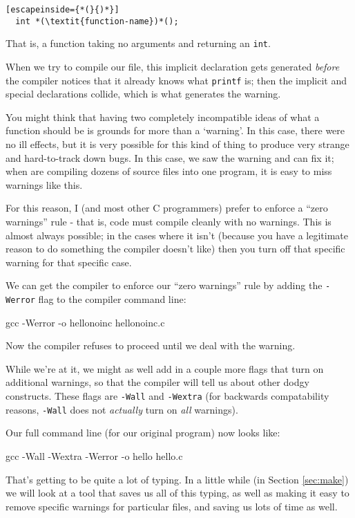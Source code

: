 \documentclass[a4paper,10pt]{article}
\newcommand{\kw}[1]{\texttt{#1}}
\begin{document}
\begin{lstlisting}[escapeinside={*(}{)*}]
  int *(\textit{function-name})*();
\end{lstlisting}

\noindent
That is, a function taking no arguments and returning an \kw{int}.

When we try to compile our file, this implicit declaration gets
generated \emph{before} the compiler notices that it already knows
what \kw{printf} is; then the implicit and special declarations
collide, which is what generates the warning.

You might think that having two completely incompatible ideas of what
a function should be is grounds for more than a `warning'. In this
case, there were no ill effects, but it is very possible for this kind
of thing to produce very strange and hard-to-track down bugs. In this
case, we saw the warning and can fix it; when are compiling dozens of
source files into one program, it is easy to miss warnings like this.

For this reason, I (and most other C programmers) prefer to enforce a
``zero warnings'' rule - that is, code must compile cleanly with no
warnings. This is almost always possible; in the cases where it isn't
(because you have a legitimate reason to do something the compiler
doesn't like) then you turn off that specific warning for that specific
case.

We can get the compiler to enforce our ``zero warnings'' rule by
adding the \kw{-Werror} flag to the compiler command line:

gcc -Werror -o hellonoinc hellonoinc.c
\END

\noindent
Now the compiler refuses to proceed until we deal with the warning.

While we're at it, we might as well add in a couple more flags that
turn on additional warnings, so that the compiler will tell us about
other dodgy constructs. These flags are \kw{-Wall} and \kw{-Wextra}
(for backwards compatability reasons, \kw{-Wall} does not
\emph{actually} turn on \emph{all} warnings).

Our full command line (for our original program) now looks like:

gcc -Wall -Wextra -Werror -o hello hello.c
\END

\noindent
That's getting to be quite a lot of typing. In a little while (in
Section \ref{sec:make}) we will look at a tool that saves us all of
this typing, as well as making it easy to remove specific warnings for
particular files, and saving us lots of time as well.
\end{document}
